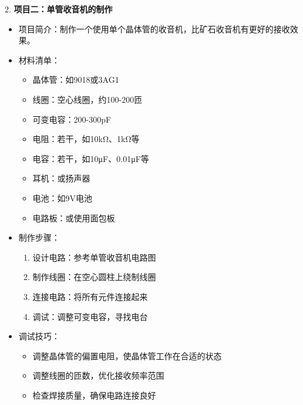\documentclass[12pt,UTF8]{ctexbook}
\begin{document}
2. \textbf{项目二：单管收音机的制作}
   \begin{itemize}[leftmargin=3.5em]
   \item 项目简介：制作一个使用单个晶体管的收音机，比矿石收音机有更好的接收效果。
   \item 材料清单：
     \begin{itemize}[leftmargin=3.5em]
     \item 晶体管：如9018或3AG1
     \item 线圈：空心线圈，约100-200匝
     \item 可变电容：200-300pF
     \item 电阻：若干，如10kΩ、1kΩ等
     \item 电容：若干，如10μF、0.01μF等
     \item 耳机：或扬声器
     \item 电池：如9V电池
     \item 电路板：或使用面包板
     \end{itemize}
   \item 制作步骤：
     \begin{enumerate}
     \item 设计电路：参考单管收音机电路图
     \item 制作线圈：在空心圆柱上绕制线圈
     \item 连接电路：将所有元件连接起来
     \item 调试：调整可变电容，寻找电台
     \end{enumerate}
   \item 调试技巧：
     \begin{itemize}[leftmargin=3.5em]
     \item 调整晶体管的偏置电阻，使晶体管工作在合适的状态
     \item 调整线圈的匝数，优化接收频率范围
     \item 检查焊接质量，确保电路连接良好
     \end{itemize}
   \end{itemize}
\end{document}
